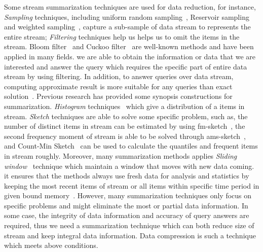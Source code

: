 Some stream summarization techniques are used for data reduction, for instance,
\emph{Sampling} techniques, including uniform random
sampling~\cite{vitter1984faster, Ahrens1985SequentialRS}, Reservoir
sampling~\cite{vitter1985random, Aggarwal2007DataS} and weighted
sampling~\cite{chaudhuri1999random, efraimidis2006weighted}, capture a
sub-sample of data stream to represents the entire stream; \emph{Filtering}
techniques help us helps us to omit the items in the stream. Bloom
filter~\cite{bloom1970space} and Cuckoo filter~\cite{fan2014cuckoo} are
well-known methods and have been applied in many fields. we are able to obtain
the information or data that we are interested and answer the query which
requires the specific part of entire data stream by using filtering. In
addition, to  answer queries over data stream, computing approximate result is
more suitable for any queries than exact solution~\cite{kejariwal2015real}.
Previous research has provided some synopsis constructions for summarization.
\emph{Histogram} techniques~\cite{kejariwal2015real, ahmed2019data} which give a
distribution of a items in stream. \emph{Sketch} techniques are able to solve
some specific problem, such as, the number of distinct items in stream can be
estimated by using \acrfull{fm-sketch}~\cite{flajolet1985probabilistic,
garofalakis2016data}, the second frequency moment of stream is able to be solved
through \acrfull{ams-sketch}~\cite{alon1999space}, and Count-Min
Sketch~\cite{cormode2005improved, garofalakis2016data} can be used to calculate
the quantiles and frequent items in stream roughly. Moreover, many summarization
methods applies \emph{Sliding window}~\cite{datar2002maintaining} technique
which maintain a window that moves with new data coming. it ensures that the
methods always use fresh data for analysis and statistics by keeping the most
recent items of stream or all items within specific time period in given bound
memory~\cite{leskovec2014mining}. However, many summarization techniques only
focus on specific problems and might eliminate the most or partial data
information. In some case, the integrity of data information and accuracy of
query answers are required, thus we need a summarization technique which can
both reduce size of stream and  keep integral data information. Data compression
is such a technique which meets above conditions. 


